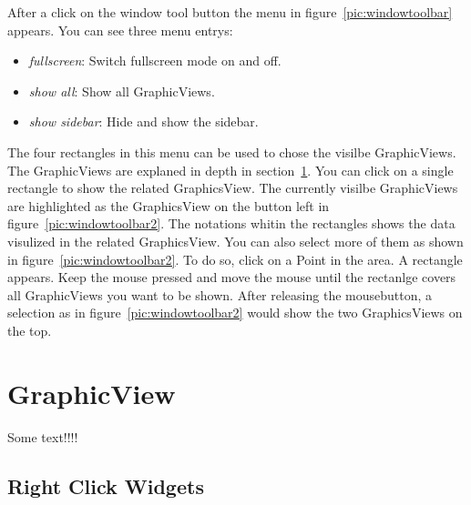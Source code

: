 \documentclass[a4paper,11pt]{report}
\begin{document}
\begin{minipage}[h]{\textwidth-7cm}
After a click on the window tool button the menu in figure~\ref{pic:windowtoolbar} appears. You can see three menu entrys:
\begin{itemize}
	\item \textit{fullscreen}: Switch fullscreen mode on and off.
	\item \textit{show all}: Show all GraphicViews.
	\item \textit{show sidebar}: Hide and show the sidebar.
\end{itemize}
The four rectangles in this menu can be used to chose the visilbe GraphicViews. The GraphicViews are explaned in depth in section~\ref{sec:graphical}. You can click on a single rectangle to show the related GraphicsView. The currently visilbe GraphicViews are highlighted as the GraphicsView on the button left in figure~\ref{pic:windowtoolbar2}. The notations whitin the rectangles shows the data visulized in the related GraphicsView. You can also select more of them as shown in figure~\ref{pic:windowtoolbar2}. To do so, click on a Point in the area. A rectangle appears. Keep the mouse pressed and move the mouse until the rectanlge covers all GraphicViews you want to be shown. After releasing the mousebutton, a selection as in figure~\ref{pic:windowtoolbar2} would show the two GraphicsViews on the top. 
\end{minipage}


\section{GraphicView}
\label{sec:graphical}

Some text!!!!


\subsection{Right Click Widgets}
\label{sec:rightclickwidgets}
\end{document}
